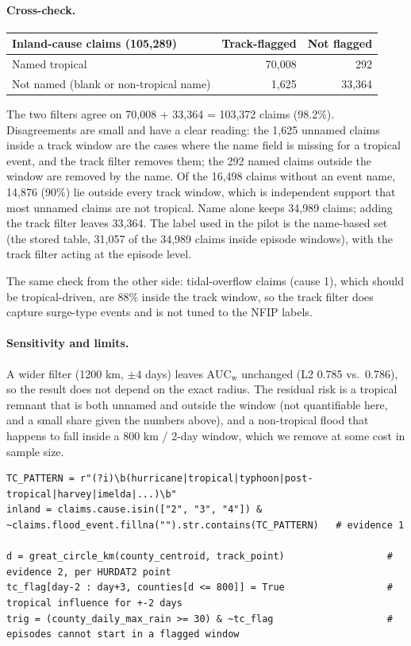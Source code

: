 \documentclass[11pt]{article}
\newcommand{\AUCw}{\mathrm{AUC}_{\mathrm{w}}}
\begin{document}
\paragraph{Cross-check.}
\begin{center}\small
\begin{tabular}{@{}lrr@{}}
\toprule
Inland-cause claims (105,289) & Track-flagged & Not flagged \\
\midrule
Named tropical & 70,008 & 292 \\
Not named (blank or non-tropical name) & 1,625 & 33,364 \\
\bottomrule
\end{tabular}
\end{center}
The two filters agree on 70,008 + 33,364 = 103,372 claims (98.2\%). Disagreements are small and have a clear reading: the 1,625 unnamed claims inside a track window are the cases where the name field is missing for a tropical event, and the track filter removes them; the 292 named claims outside the window are removed by the name. Of the 16,498 claims without an event name, 14,876 (90\%) lie outside every track window, which is independent support that most unnamed claims are not tropical. Name alone keeps 34,989 claims; adding the track filter leaves 33,364. The label used in the pilot is the name-based set (the stored table, 31,057 of the 34,989 claims inside episode windows), with the track filter acting at the episode level.

The same check from the other side: tidal-overflow claims (cause 1), which should be tropical-driven, are 88\% inside the track window, so the track filter does capture surge-type events and is not tuned to the NFIP labels.

\paragraph{Sensitivity and limits.}
A wider filter (1200 km, $\pm4$ days) leaves $\AUCw$ unchanged (L2 0.785 vs.\ 0.786), so the result does not depend on the exact radius. The residual risk is a tropical remnant that is both unnamed and outside the window (not quantifiable here, and a small share given the numbers above), and a non-tropical flood that happens to fall inside a 800 km / 2-day window, which we remove at some cost in sample size.

\begin{lstlisting}
TC_PATTERN = r"(?i)\b(hurricane|tropical|typhoon|post-tropical|harvey|imelda|...)\b"
inland = claims.cause.isin(["2", "3", "4"]) & ~claims.flood_event.fillna("").str.contains(TC_PATTERN)   # evidence 1

d = great_circle_km(county_centroid, track_point)                  # evidence 2, per HURDAT2 point
tc_flag[day-2 : day+3, counties[d <= 800]] = True                  # tropical influence for +-2 days
trig = (county_daily_max_rain >= 30) & ~tc_flag                    # episodes cannot start in a flagged window
\end{lstlisting}
\end{document}
